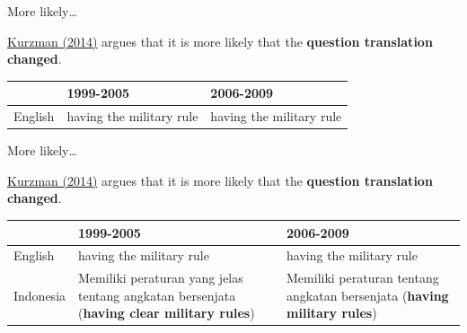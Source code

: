 \documentclass[10pt]{beamer}
\begin{document}
\begin{frame}{More likely\ldots}

    \href{https://www.washingtonpost.com/news/monkey-cage/wp/2014/09/02/world-values-lost-in-translation/}{Kurzman (2014)} argues that it is more likely that the \textbf{question translation changed}.
{\small{
    \begin{table}
        \begin{tabular}{l p{3.5cm} p{3.5cm}}
        \hline
        & 1999-2005 & 2006-2009\\
        \hline\hline
        English & having the military rule & having the military rule \\

        \hline
        \end{tabular}
    \end{table}

}}

\end{frame}

\begin{frame}{More likely\ldots}

    \href{https://www.washingtonpost.com/news/monkey-cage/wp/2014/09/02/world-values-lost-in-translation/}{Kurzman (2014)} argues that it is more likely that the \textbf{question translation changed}.
{\small{
    \begin{table}
        \begin{tabular}{l p{3.5cm} p{3.5cm}}
        \hline
        & 1999-2005 & 2006-2009\\
        \hline\hline
        English & having the military rule & having the military rule \\

        Indonesia & Memiliki peraturan yang jelas tentang angkatan bersenjata (\textbf{having clear military rules}) & Memiliki peraturan tentang angkatan bersenjata (\textbf{having military rules})\\

        \hline
        \end{tabular}
    \end{table}

}}

\end{frame}
\end{document}
